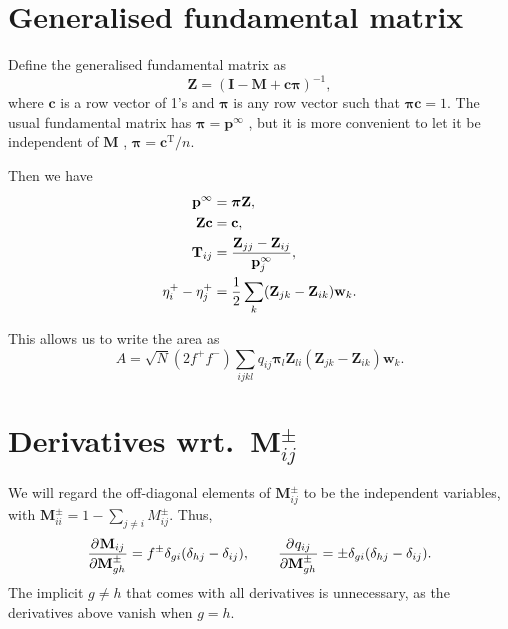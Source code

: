 \documentclass[12pt]{article}
\newcommand{\I}{\mathbf{I}}
\newcommand{\M}{\mathbf{M}}
\newcommand{\pp}{\mathbf{p}^\infty}
\newcommand{\T}{\mathbf{T}}
\newcommand{\Zb}{\mathbf{Z}}
\newcommand{\w}{\mathbf{w}}
\newcommand{\onev}{\mathbf{c}}
\newcommand{\pib}{\boldsymbol{\pi}}
\begin{document}

\section{Generalised fundamental matrix}\label{sec:fundamental}

Define the generalised fundamental matrix as
%
\begin{equation}\label{eq:funddef}
  \Zb = (\I - \M + \onev\pib)^{-1},
\end{equation}
%
where $\onev$ is a row vector of 1's and $\pib$ is any row vector such that $\pib\onev=1$. The usual fundamental matrix has $\pib=\pp$ \cite[\S3.2]{kemeny1960finite}, but it is more convenient to let it be independent of $\M$ \cite[App.VIII]{kemeny1960finite}, \eg $\pib=\onev^\mathrm{T}/n$.

Then we have
%
\begin{equation}\label{eq:fromfund}
  \begin{aligned}
    \pp &= \pib \Zb, \\
    \Zb \onev &= \onev , \\
    \T_{ij} &= \frac{\Zb_{jj}-\Zb_{ij}}{\pp_j}, \\
    \eta^+_i - \eta^+_j &= \half\sum_k (\Zb_{jk}-\Zb_{ik})\w_k.
  \end{aligned}
\end{equation}
%

This allows us to write the area as
%
\begin{equation}\label{eq:arefund}
  A = \sqrt{N}(2f^+f^-)\sum_{ijkl} q_{ij} \pib_l \Zb_{li} (\Zb_{jk} - \Zb_{ik}) \w_k.
\end{equation}
%


\section{Derivatives wrt.\ $\M^\pm_{ij}$}\label{sec:derivs}

We will regard the off-diagonal elements of $\M^\pm_{ij}$ to be the independent variables, with $\M^\pm_{ii}=1-\sum_{j \neq i} M^\pm_{ij}$. Thus,
%
\begin{equation}\label{eq:basicderivs}
  \pdiff{\M_{ij}}{\M^\pm_{gh}} = f^\pm \delta_{gi}(\delta_{hj}-\delta_{ij}),
  \qquad
  \pdiff{q_{ij}}{\M^\pm_{gh}} = \pm\delta_{gi}(\delta_{hj}-\delta_{ij}).
\end{equation}
%
The implicit $g \neq h$ that comes with all derivatives is unnecessary, as the derivatives above vanish when $g=h$.
\end{document}
